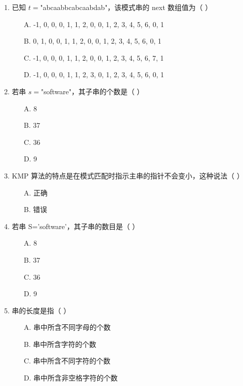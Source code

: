 \documentclass[12pt, a4paper]{article}
\begin{document}
\begin{enumerate}[label=\arabic*.]
	\item 已知 $t=$"abcaabbcabcaabdab"，该模式串的 next 数组值为（ ）
	      \begin{enumerate}
		      \item[A.] -1, 0, 0, 0, 1, 1, 2, 0, 0, 1, 2, 3, 4, 5, 6, 0, 1
		      \item[B.] 0, 1, 0, 0, 1, 1, 2, 0, 0, 1, 2, 3, 4, 5, 6, 0, 1
		      \item[C.] -1, 0, 0, 0, 1, 1, 2, 0, 0, 1, 2, 3, 4, 5, 6, 7, 1
		      \item[D.] -1, 0, 0, 0, 1, 1, 2, 3, 0, 1, 2, 3, 4, 5, 6, 0, 1
	      \end{enumerate}

	\item 若串 $s=$"software"，其子串的个数是（ ）
	      \begin{enumerate}
		      \item[A.] 8
		      \item[B.] 37
		      \item[C.] 36
		      \item[D.] 9
	      \end{enumerate}

	\item KMP 算法的特点是在模式匹配时指示主串的指针不会变小，这种说法（ ）
	      \begin{enumerate}
		      \item[A.] 正确
		      \item[B.] 错误
	      \end{enumerate}

	\item 若串 S='software'，其子串的数目是（ ）
	      \begin{enumerate}
		      \item[A.] 8
		      \item[B.] 37
		      \item[C.] 36
		      \item[D.] 9
	      \end{enumerate}

	\item 串的长度是指（ ）
	      \begin{enumerate}
		      \item[A.] 串中所含不同字母的个数
		      \item[B.] 串中所含字符的个数
		      \item[C.] 串中所含不同字符的个数
		      \item[D.] 串中所含非空格字符的个数
	      \end{enumerate}


\end{enumerate}
\end{document}

